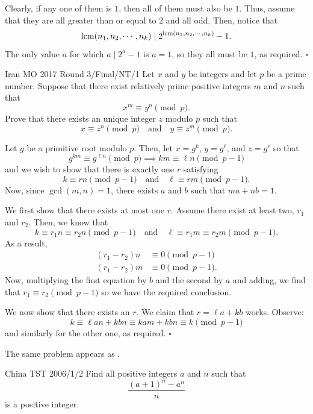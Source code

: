 \documentclass{article}
\begin{document}
Clearly, if any one of them is $1$, then all of them must also be $1$. Thus, assume that they are all greater than or equal to $2$ and all odd. Then, notice that \[\operatorname{lcm}(n_1, n_2, \cdots, n_k) \mid 2^{\operatorname{lcm}(n_1, n_2, \cdots, n_k)}-1.\] The only value $a$ for which $a \mid 2^a-1$ is $a = 1$, so they all must be $1$, as required. $\square$

\begin{problem}[5.9.6]{Iran MO 2017 Round 3/Final/NT/1}
Let $x$ and $y$ be integers and let $p$ be a prime number. Suppose that there exist relatively prime positive integers $m$ and $n$ such that \[x^m \equiv y^n \pmod{p}.\] Prove that there exists an unique integer $z$ modulo $p$ such that \[x \equiv z^n \pmod{p} \quad \text{and} \quad y \equiv z^m \pmod{p}.\]
\end{problem}

Let $g$ be a primitive root modulo $p$. Then, let $x = g^k$, $y = g^{\ell}$, and $z = g^r$ so that \[g^{km} \equiv g^{\ell n} \pmod{p} \implies km \equiv \ell n \pmod{p-1}\] and we wish to show that there is exactly one $r$ satisfying \[k \equiv rn \pmod{p-1} \quad \text{and} \quad \ell \equiv rm \pmod{p-1}.\] Now, since $\gcd(m, n) = 1$, there exists $a$ and $b$ such that $ma+nb = 1$. 

We first show that there exists at most one $r$. Assume there exist at least two, $r_1$ and $r_2$. Then, we know that \[k \equiv r_1n \equiv r_2n \pmod{p-1} \quad \text{and} \quad \ell \equiv r_1m \equiv r_2m \pmod{p-1}.\] As a result,
\begin{align*}
(r_1-r_2)n &\equiv 0 \pmod{p-1} \\
(r_1-r_2)m &\equiv 0 \pmod{p-1}.
\end{align*}
Now, multiplying the first equation by $b$ and the second by $a$ and adding, we find that $r_1 \equiv r_2 \pmod{p-1}$ so we have the required conclusion.

We now show that there exists an $r$. We claim that $r = \ell a + kb$ works. Observe: \[k \equiv \ell an + kbn \equiv kam + kbn \equiv k \pmod{p-1}\] and similarly for the other one, as required. $\square$

\begin{remark*}
The same problem appears as .
\end{remark*}

\begin{problem}[5.9.7]{China TST 2006/1/2}
Find all positive integers $a$ and $n$ such that \[\dfrac{(a+1)^n-a^n}{n}\] is a positive integer.
\end{problem}
\end{document}
